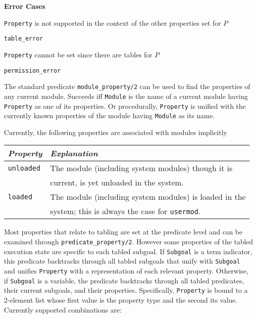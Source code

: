 \begin{description}
{\bf Error Cases}
\bi
\item {\tt Property} is not supported in the context of the other
  properties set for $P$
 \bi
\item 	{\tt table\_error}
\ei
\item {\tt Property} cannot be set since there are tables for $P$
\bi
\item 	{\tt permission\_error}
\ei
\ei
%

    The standard predicate {\tt module\_property/2} can be used to find the
    properties of any current module.
    Succeeds iff {\tt Module} is the name of a current module having 
    {\tt Property} as one of its properties. Or procedurally, {\tt Property}
    is unified with the currently known properties of the module having 
    {\tt Module} as its name.

    Currently, the following properties are associated with modules 
    implicitly 

    \begin{center}
    \begin{tabular}{||l|l||}               \hline 
	{\em Property}		& {\em Explanation} \\ \hline \hline
	{\tt unloaded}		& 
		The module (including system modules) though it is \\
	&	current, is yet unloaded in the system. \\ \hline
	{\tt loaded}		& 
		The module (including system modules) is loaded in the \\
	&	system; this is always the case for {\tt usermod}.\\ \hline
    \end{tabular}
    \end{center}

%
Most properties that relate to tabling are set at the predicate level
and can be examined through {\tt predicate\_property/2}.  However some
properties of the tabled execution state are specific to each tabled
subgoal.  If {\tt Subgoal} is a term indicator, this predicate
backtracks through all tabled subgoals that unify with {\tt Subgoal}
and unifies {\tt Property} with a representation of each relevant
property.  Otherwise, if {\tt Subgoal} is a variable, the predicate
backtracks through all tabled predicates, their current subgoals, and
their properties.  Specifically, {\tt Property} is bound to a
2-element list whose first value is the property type and the second
its value.  Currently supported combinations are:


\end{description}
